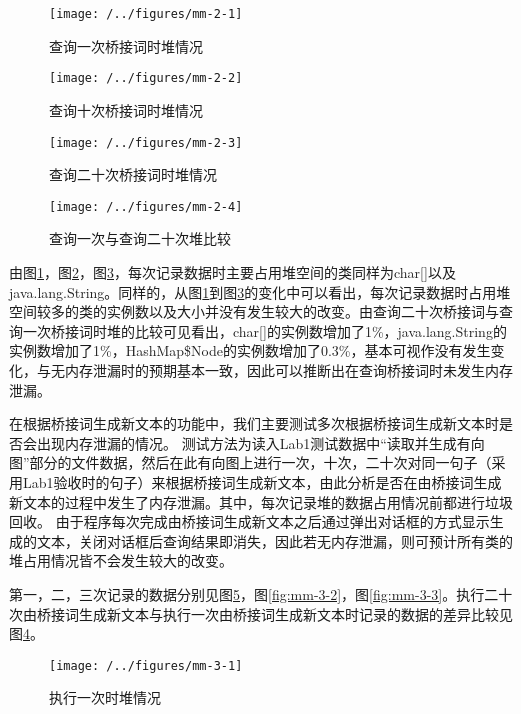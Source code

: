\begin{figure}
\centering
\texttt{[image: /../figures/mm-2-1]}
\caption{查询一次桥接词时堆情况}
\label{fig:mm-2-1}
\end{figure}

\begin{figure}
\centering
\texttt{[image: /../figures/mm-2-2]}
\caption{查询十次桥接词时堆情况}
\label{fig:mm-2-2}
\end{figure}

\begin{figure}
\centering
\texttt{[image: /../figures/mm-2-3]}
\caption{查询二十次桥接词时堆情况}
\label{fig:mm-2-3}
\end{figure}

\begin{figure}
\centering
\texttt{[image: /../figures/mm-2-4]}
\caption{查询一次与查询二十次堆比较}
\label{fig:mm-2-4}
\end{figure}

由图\ref{fig:mm-2-1}，图\ref{fig:mm-2-2}，图\ref{fig:mm-2-3}，每次记录数据时主要占用堆空间的类同样为char[]以及java.lang.String。同样的，从图\ref{fig:mm-2-1}到图\ref{fig:mm-2-3}的变化中可以看出，每次记录数据时占用堆空间较多的类的实例数以及大小并没有发生较大的改变。由查询二十次桥接词与查询一次桥接词时堆的比较可见看出，char[]的实例数增加了1\%，java.lang.String的实例数增加了1\%，HashMap\$Node的实例数增加了0.3\%，基本可视作没有发生变化，与无内存泄漏时的预期基本一致，因此可以推断出在查询桥接词时未发生内存泄漏。

在根据桥接词生成新文本的功能中，我们主要测试多次根据桥接词生成新文本时是否会出现内存泄漏的情况。
测试方法为读入Lab1测试数据中“读取并生成有向图”部分的文件数据，然后在此有向图上进行一次，十次，二十次对同一句子（采用Lab1验收时的句子）来根据桥接词生成新文本，由此分析是否在由桥接词生成新文本的过程中发生了内存泄漏。其中，每次记录堆的数据占用情况前都进行垃圾回收。
由于程序每次完成由桥接词生成新文本之后通过弹出对话框的方式显示生成的文本，关闭对话框后查询结果即消失，因此若无内存泄漏，则可预计所有类的堆占用情况皆不会发生较大的改变。

第一，二，三次记录的数据分别见图\ref{fig:mm-3-1}，图\ref{fig:mm-3-2}，图\ref{fig:mm-3-3}。执行二十次由桥接词生成新文本与执行一次由桥接词生成新文本时记录的数据的差异比较见图\ref{fig:mm-2-4}。

\begin{figure}
\centering
\texttt{[image: /../figures/mm-3-1]}
\caption{执行一次时堆情况}
\label{fig:mm-3-1}
\end{figure}

